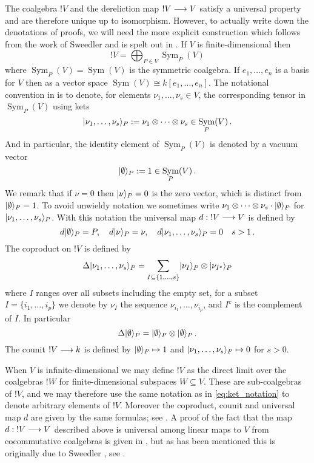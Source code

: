 \documentclass[english,letter paper,12pt,reqno]{article}
\DeclarePairedDelimiter\ket{\lvert}{\rangle}
\theoremstyle{example}
\def\vacu{\ket{\emptyset}}
\DeclareMathOperator{\Sym}{Sym}
\begin{document}
The coalgebra ${!} V$ and the dereliction map ${!} V \longrightarrow V$ satisfy a universal property and are therefore unique up to isomorphism. However, to actually write down the denotations of proofs, we will need the more explicit construction which follows from the work of Sweedler \cite{sweedler} and is spelt out in \cite{murfet_coalg}. If $V$ is finite-dimensional then
\begin{equation}\label{eq:presentation_intro}
{!} V = \bigoplus_{P \in V} \Sym_P(V)
\end{equation}
where $\Sym_P(V) = \Sym(V)$ is the symmetric coalgebra. If $e_1,\ldots,e_n$ is a basis for $V$ then as a vector space $\Sym(V) \cong k[e_1,\ldots,e_n]$. The notational convention in \cite{murfet_coalg} is to denote, for elements $\nu_1,\ldots,\nu_s \in V$, the corresponding tensor in $\Sym_P(V)$ using kets
\begin{equation}\label{eq:ket_notation}
\ket{\nu_1,\ldots,\nu_s}_P := \nu_1 \otimes \cdots \otimes \nu_s \in \Sym_P(V)\,.
\end{equation}
And in particular, the identity element of $\Sym_P(V)$ is denoted by a vacuum vector
\begin{equation}\label{eq:vacuum}
\vacu_P := 1 \in \Sym_P(V)\,.
\end{equation}
We remark that if $\nu = 0$ then $\ket{\nu}_P = 0$ is the zero vector, which is distinct from $\vacu_P = 1$. To avoid unwieldy notation we sometimes write $\nu_1 \otimes \cdots \otimes \nu_s \cdot \vacu_P$ for $\ket{\nu_1,\ldots,\nu_s}_P$. With this notation the universal map $d: {!} V \longrightarrow V$ is defined by
\[
d \vacu_P = P, \quad d\ket{\nu}_P = \nu, \quad d\ket{\nu_1,\ldots,\nu_s}_P = 0 \quad s > 1\,.
\]
The coproduct on ${!} V$ is defined by
\begin{equation}\label{eq:lc_coalgebra_1}
\Delta \ket{ \nu_1, \ldots, \nu_s }_P = \sum_{I \subseteq \{ 1, \ldots, s \}} \ket{ \nu_I }_P \otimes \ket{ \nu_{I^c} }_P
\end{equation}
where $I$ ranges over all subsets including the empty set, for a subset $I = \{ i_1, \ldots, i_p \}$ we denote by $\nu_I$ the sequence $\nu_{i_1},\ldots,\nu_{i_p}$, and $I^c$ is the complement of $I$. In particular
\[
\Delta \vacu_P = \vacu_P \otimes \vacu_P\,.
\]
The counit ${!} V \longrightarrow k$ is defined by $\vacu_P \mapsto 1$ and $\ket{\nu_1,\ldots,\nu_s}_P \mapsto 0$ for $s > 0$.

When $V$ is infinite-dimensional we may define ${!} V$ as the direct limit over the coalgebras ${!} W$ for finite-dimensional subspaces $W \subseteq V$. These are sub-coalgebras of ${!} V$, and we may therefore use the same notation as in \eqref{eq:ket_notation} to denote arbitrary elements of ${!} V$. Moreover the coproduct, counit and universal map $d$ are given by the same formulas; see \cite[\S 2.1]{murfet_coalg}. A proof of the fact that the map $d: {!} V \longrightarrow V$ described above is universal among linear maps to $V$ from cocommutative coalgebras is given in \cite[Theorem 2.18]{murfet_coalg}, but as has been mentioned this is originally due to Sweedler \cite{sweedler}, see \cite[Appendix B]{murfet_coalg}.
\end{document}
